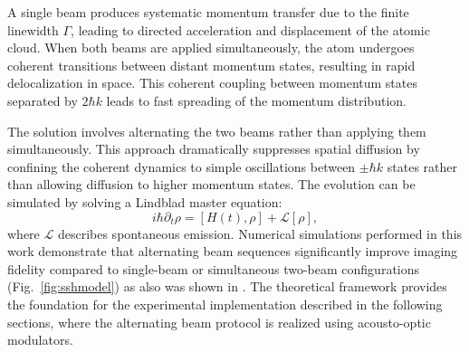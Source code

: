 A single beam produces systematic momentum transfer due to the finite linewidth $\Gamma$, leading to directed acceleration and displacement of the atomic cloud. When both beams are applied simultaneously, the atom undergoes coherent transitions between distant momentum states, resulting in rapid delocalization in space. This coherent coupling between momentum states separated by $2\hbar k$ leads to fast spreading of the momentum distribution.

The solution involves alternating the two beams rather than applying them simultaneously. This approach dramatically suppresses spatial diffusion by confining the coherent dynamics to simple oscillations between $\pm\hbar k$ states rather than allowing diffusion to higher momentum states. The evolution can be simulated by solving a Lindblad master equation:
\begin{equation}
i\hbar \partial_t \rho = [H(t), \rho] + \mathcal{L}[\rho],
\end{equation}
where $\mathcal{L}$ describes spontaneous emission. Numerical simulations performed in this work demonstrate that alternating beam sequences significantly improve imaging fidelity compared to single-beam or simultaneous two-beam configurations (Fig.~\ref{fig:sshmodel}) as also was shown in \cite{su_fast_2025,bergschneider_spin-resolved_2018}.
The theoretical framework provides the foundation for the experimental implementation described in the following sections, where the alternating beam protocol is realized using acousto-optic modulators.